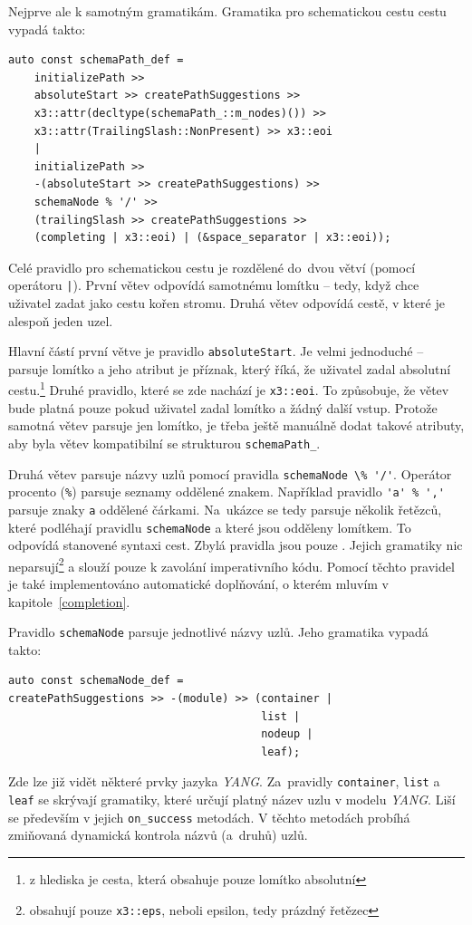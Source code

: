 \documentclass[thesis=B,czech,hidelinks]{FITthesis}[2019/03/06]
\begin{document}
Nejprve ale k samotným gramatikám. Gramatika pro schematickou cestu cestu vypadá takto:
\clearpage
\begin{verbatim}
auto const schemaPath_def =
    initializePath >>
    absoluteStart >> createPathSuggestions >>
    x3::attr(decltype(schemaPath_::m_nodes)()) >>
    x3::attr(TrailingSlash::NonPresent) >> x3::eoi
    |
    initializePath >>
    -(absoluteStart >> createPathSuggestions) >>
    schemaNode % '/' >>
    (trailingSlash >> createPathSuggestions >>
    (completing | x3::eoi) | (&space_separator | x3::eoi));
\end{verbatim}
Celé pravidlo pro schematickou cestu je rozdělené do~dvou větví (pomocí operátoru \texttt{|}). První větev odpovídá samotnému lomítku -- tedy, když chce uživatel zadat jako cestu kořen stromu. Druhá větev odpovídá cestě, v které je alespoň jeden uzel.

Hlavní částí první větve je pravidlo \texttt{absoluteStart}. Je velmi jednoduché -- parsuje lomítko a jeho atribut je příznak, který říká, že uživatel zadal absolutní cestu.\footnote{z hlediska  je cesta, která obsahuje pouze lomítko absolutní} Druhé pravidlo, které se zde nachází je \texttt{x3::eoi}. To způsobuje, že větev bude platná pouze pokud uživatel zadal lomítko a žádný další vstup. Protože samotná větev parsuje jen lomítko, je třeba ještě manuálně dodat takové atributy, aby byla větev kompatibilní se strukturou \texttt{schemaPath\_}.

Druhá větev parsuje názvy uzlů pomocí pravidla \verb¨schemaNode \% '/'¨. Operátor procento (\texttt{\%}) parsuje seznamy oddělené znakem. Například pravidlo \verb¨'a' % ','¨ parsuje znaky \texttt{a} oddělené čárkami. Na~ukázce se tedy parsuje několik řetězců, které podléhají pravidlu \texttt{schemaNode} a které jsou odděleny lomítkem. To odpovídá stanovené syntaxi cest. Zbylá pravidla jsou pouze . Jejich gramatiky nic neparsují\footnote{obsahují pouze \texttt{x3::eps}, neboli epsilon, tedy prázdný řetězec} a slouží pouze k zavolání imperativního kódu. Pomocí těchto pravidel je také implementováno automatické doplňování, o kterém mluvím v kapitole~\ref{completion}.

Pravidlo \texttt{schemaNode} parsuje jednotlivé názvy uzlů. Jeho gramatika vypadá takto:
\begin{verbatim}
auto const schemaNode_def =
createPathSuggestions >> -(module) >> (container |
                                       list |
                                       nodeup |
                                       leaf);
\end{verbatim}
Zde lze již vidět některé prvky jazyka \textit{YANG}. Za~pravidly \texttt{container}, \texttt{list} a \texttt{leaf} se skrývají gramatiky, které určují platný název uzlu v modelu \textit{YANG}. Liší se především v jejich \verb¨on_success¨ metodách. V těchto metodách probíhá zmiňovaná dynamická kontrola názvů (a~druhů) uzlů.
\end{document}
